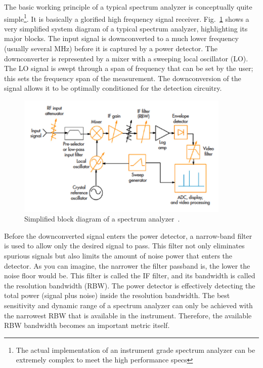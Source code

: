 \documentclass[letterpaper, 11pt]{article}
\begin{document}
The basic working principle of a typical spectrum analyzer is conceptually quite simple\footnote{The actual implementation of an instrument grade spectrum analyzer can be extremely complex to meet the high performance specs}. It is basically a glorified high frequency signal receiver. Fig.~\ref{fig:sa-blocks} shows a very simplified system diagram of a typical spectrum analyzer, highlighting its major blocks. The input signal is downconverted to a much lower frequency (usually several MHz) before it is captured by a power detector. The downconverter is represented by a mixer with a sweeping local oscillator (LO). The LO signal is swept through a span of frequency that can be set by the user; this sets the frequency span of the measurement. The downconversion of the signal allows it to be optimally conditioned for the detection circuitry. 

\begin{figure}[h]
	\centering
	\includegraphics[width=4in]{sa-blocks}
	\caption{Simplified block diagram of a spectrum analyzer~\cite{diez-sa}.}
	\label{fig:sa-blocks}
\end{figure}

Before the downconverted signal enters the power detector, a narrow-band filter is used to allow only the desired signal to pass. This filter not only eliminates spurious signals but also limits the amount of noise power that enters the detector. As you can imagine, the narrower the filter passband is, the lower the noise floor would be. This filter is called the IF filter, and its bandwidth is called the resolution bandwidth (RBW). The power detector is effectively detecting the total power (signal plus noise) inside the resolution bandwidth. The best sensitivity and dynamic range of a spectrum analyzer can only be achieved with the narrowest RBW that is available in the instrument. Therefore, the available RBW bandwidth becomes an important metric itself. 
\end{document}
